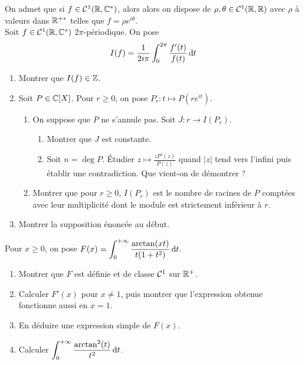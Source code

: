 \documentclass[12pt,a4paper]{exo_book}
\begin{document}
\begin{exo}
    On admet que si $f \in \mathcal{C}^1 (\mathbb{R}, \mathbb{C}^*)$, alors alors on dispose de $\rho,\theta \in \mathcal{C}^1 (\mathbb{R},\mathbb{R})$ avec $\rho$ à valeurs dans $\mathbb{R}^{+*}$ telles que $f = \rho e^{i \theta}$. \\
    Soit $f \in \mathcal{C}^1(\mathbb{R}, \mathbb{C}^*)$ $2\pi$-périodique. On pose
    \[I(f) = \frac{1}{2i\pi} \int_0^{2\pi} \frac{f'(t)}{f(t)} {\rm \, d} t\]
    \begin{enumerate}
        \item Montrer que $I(f) \in \mathbb{Z}$.
        \item Soit $P \in \mathbb{C}[X]$. Pour $r\ge0$, on pose $P_r : t \mapsto P(re^{it})$.
        \begin{enumerate}
            \item On suppose que $P$ ne s'annule pas. Soit $J : r \to I(P_r)$.
            \begin{enumerate}
                \item Montrer que $J$ est constante.
                \item Soit $n = \deg P$. Étudier $z\mapsto \frac{zP'(z)}{P(z)}$ quand $|z|$ tend vers l'infini puis établir une contradiction. Que vient-on de démontrer ?
            \end{enumerate}
            \item Montrer que pour $r\ge0$, $I(P_r)$ est le nombre de racines de $P$ comptées avec leur multiplicité dont le module est strictement inférieur à $r$.
        \end{enumerate}
        \item Montrer la supposition énoncée au début.
    \end{enumerate}
\end{exo}

\begin{exo}
    Pour $x \ge 0$, on pose $ \displaystyle F(x) = \int_0^{+\infty} \frac{\arctan(xt)}{t(1+t^2)} {\rm \, d} t$.

    \begin{enumerate}
        \item Montrer que $F$ est définie et de classe $\mathcal{C}^1$ sur $\mathbb{R}^+$.
        \item Calculer $F'(x)$ pour $x \ne 1$, puis montrer que l'expression obtenue fonctionne aussi en $x = 1$.
        \item En déduire une expression simple de $F(x)$.
        \item Calculer $\displaystyle \int_0^{+\infty} \frac{\arctan^2(t)}{t^2} {\rm \, d} t$.
    \end{enumerate}
\end{exo}
\end{document}
